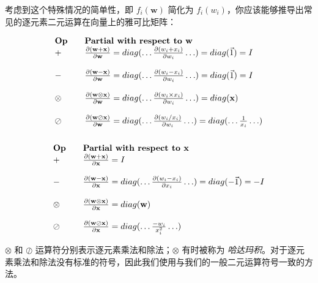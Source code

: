 \documentclass{ctexart}
\begin{document}
考虑到这个特殊情况的简单性，即 $f_i(\mathbf{w})$ 简化为 $f_i(w_i)$，你应该能够推导出常见的逐元素二元运算在向量上的雅可比矩阵：

\[
\begin{array}{lllllllll}
        \text{\bf{Op}} &  & {\text{\bf Partial with respect to }} \mathbf{w} \\
        + &  & \frac{\partial (\mathbf{w+x})}{\partial \mathbf{w}} = diag(\ldots \frac{\partial (w_i + x_i)}{\partial w_i} \ldots) = diag(\vec{1}) = I \\\\
        - &  & \frac{\partial (\mathbf{w-x})}{\partial \mathbf{w}}  =  diag(\ldots\frac{\partial (w_i - x_i)}{\partial w_i}\ldots) =  diag(\vec{1})  =  I \\\\
        \otimes &  & \frac{\partial (\mathbf{w \otimes x})}{\partial \mathbf{w}}  =  diag(\ldots\frac{\partial (w_i \times x_i)}{\partial w_i} \ldots)  =  diag(\mathbf{x}) \\\\
        \oslash &  & \frac{\partial (\mathbf{w \oslash x})}{\partial \mathbf{w}}  =  diag(\ldots\frac{\partial (w_i / x_i)}{\partial w_i}\ldots)  =  diag(\ldots \frac{1}{x_i} \ldots) \\\\
\end{array}
\]\[
\begin{array}{lllllllll}
        \text{\bf{Op}} &  &  {\text{\bf Partial with respect to }}\mathbf{x}\\
        + &  & \frac{\partial (\mathbf{w+x})}{\partial \mathbf{x}} =  I\\\\
        - &  & \frac{\partial (\mathbf{w-x})}{\partial \mathbf{x}}  =  diag(\ldots\frac{\partial (w_i - x_i)}{\partial x_i}\ldots)  =  diag(-\vec{1})  =  -I \\\\
        \otimes &  &  \frac{\partial (\mathbf{w \otimes x})}{\partial \mathbf{x}}  =  diag(\mathbf{w})\\\\
        \oslash &  &  \frac{\partial (\mathbf{w \oslash x})}{\partial \mathbf{x}}  =  diag(\ldots \frac{-w_i}{x_i^2} \ldots)\\
\end{array}
\]

$\otimes$ 和 $\oslash$ 运算符分别表示逐元素乘法和除法；$\otimes$ 有时被称为 {\em 哈达玛积}。对于逐元素乘法和除法没有标准的符号，因此我们使用与我们的一般二元运算符号一致的方法。
\end{document}
